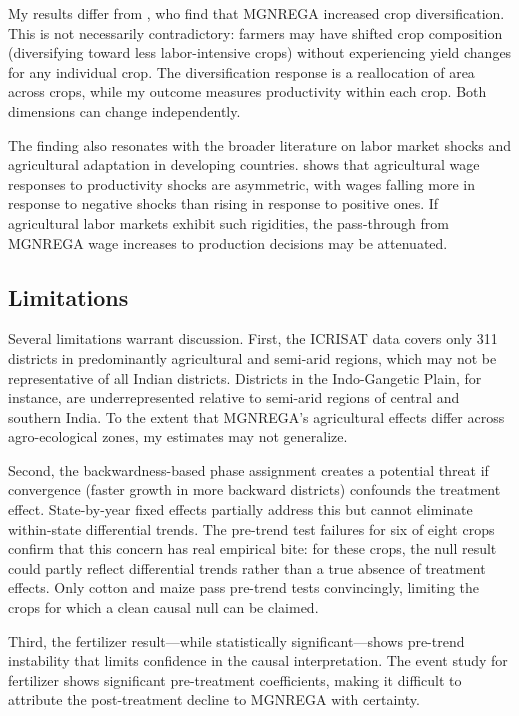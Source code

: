 \documentclass[12pt]{article}
\begin{document}
My results differ from \citet{thomas2021effect}, who find that MGNREGA increased crop diversification. This is not necessarily contradictory: farmers may have shifted crop composition (diversifying toward less labor-intensive crops) without experiencing yield changes for any individual crop. The diversification response is a reallocation of area across crops, while my outcome measures productivity within each crop. Both dimensions can change independently.

The finding also resonates with the broader literature on labor market shocks and agricultural adaptation in developing countries. \citet{jayachandran2006selling} shows that agricultural wage responses to productivity shocks are asymmetric, with wages falling more in response to negative shocks than rising in response to positive ones. If agricultural labor markets exhibit such rigidities, the pass-through from MGNREGA wage increases to production decisions may be attenuated.

\subsection{Limitations}

Several limitations warrant discussion. First, the ICRISAT data covers only 311 districts in predominantly agricultural and semi-arid regions, which may not be representative of all Indian districts. Districts in the Indo-Gangetic Plain, for instance, are underrepresented relative to semi-arid regions of central and southern India. To the extent that MGNREGA's agricultural effects differ across agro-ecological zones, my estimates may not generalize.

Second, the backwardness-based phase assignment creates a potential threat if convergence (faster growth in more backward districts) confounds the treatment effect. State-by-year fixed effects partially address this but cannot eliminate within-state differential trends. The pre-trend test failures for six of eight crops confirm that this concern has real empirical bite: for these crops, the null result could partly reflect differential trends rather than a true absence of treatment effects. Only cotton and maize pass pre-trend tests convincingly, limiting the crops for which a clean causal null can be claimed.

Third, the fertilizer result---while statistically significant---shows pre-trend instability that limits confidence in the causal interpretation. The event study for fertilizer shows significant pre-treatment coefficients, making it difficult to attribute the post-treatment decline to MGNREGA with certainty.
\end{document}
